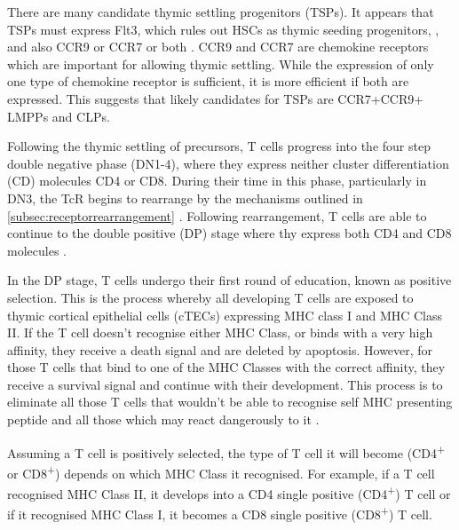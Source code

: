 There are many candidate thymic settling progenitors (TSPs).
It appears that TSPs must express Flt3, which rules out HSCs as thymic seeding progenitors, \citep{Zlotoff2011}, and also CCR9 or CCR7 or both \citep{Zlotoff2010}.
CCR9 and CCR7 are chemokine receptors which are important for allowing thymic settling. 
While the expression of only one type of chemokine receptor is sufficient, it is more efficient if both are expressed.
This suggests that likely candidates for TSPs are CCR7+CCR9+ LMPPs and CLPs\citep{Zlotoff2011}.

Following the thymic settling of precursors, T cells progress into the four step double negative phase (DN1-4), where they express neither cluster differentiation (CD) molecules CD4 or CD8.
During their time in this phase, particularly in DN3, the TcR begins to rearrange by the mechanisms outlined in \cref{subsec:receptorrearrangement} \citep{Starr2003}.
Following rearrangement, T cells are able to continue to the double positive (DP) stage where thy express both CD4 and CD8 molecules \citep{Zuniga1996}.


In the DP stage, T cells undergo their first round of education, known as positive selection.
This is the process whereby all developing T cells are exposed to thymic cortical epithelial cells (cTECs) expressing MHC class I and MHC Class II.
If the T cell doesn't recognise either MHC Class, or binds with a very high affinity, they receive a death signal and are deleted by apoptosis.
However, for those T cells that bind to one of the MHC Classes with the correct affinity, they receive a survival signal and continue with their development.
This process is to eliminate all those T cells that wouldn't be able to recognise self MHC presenting peptide and all those which  may react dangerously to it \citep{Jameson1998, Starr2003}.

Assuming a T cell is positively selected, the type of T cell it will become (CD4\textsuperscript{+} or CD8\textsuperscript{+}) depends on which MHC Class it recognised.
For example, if a T cell recognised MHC Class II, it develops into a CD4 single positive (CD4\textsuperscript{+}) T cell or if it recognised MHC Class I, it becomes a CD8 single positive (CD8\textsuperscript{+}) T cell.

